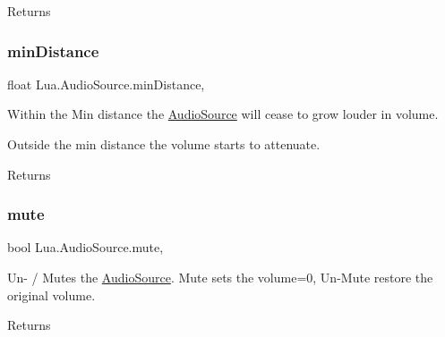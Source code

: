 \begin{DoxyReturn}{Returns}

\end{DoxyReturn}
\mbox{\label{class_lua_1_1_audio_source_a66155ad664c665455476ea70f4779669}} 
\subsubsection{\texorpdfstring{minDistance}{minDistance}}
{\footnotesize\ttfamily float Lua.\+Audio\+Source.\+min\+Distance\hspace{0.3cm}{\ttfamily [get]}, {\ttfamily [set]}}



Within the Min distance the \mbox{\hyperlink{class_lua_1_1_audio_source}{Audio\+Source}} will cease to grow louder in volume. 

Outside the min distance the volume starts to attenuate. \begin{DoxyReturn}{Returns}

\end{DoxyReturn}
\mbox{\label{class_lua_1_1_audio_source_ad82dcfe66567f1dac8a15edc327c89ff}} 
\subsubsection{\texorpdfstring{mute}{mute}}
{\footnotesize\ttfamily bool Lua.\+Audio\+Source.\+mute\hspace{0.3cm}{\ttfamily [get]}, {\ttfamily [set]}}



Un-\/ / Mutes the \mbox{\hyperlink{class_lua_1_1_audio_source}{Audio\+Source}}. Mute sets the volume=0, Un-\/\+Mute restore the original volume. 

\begin{DoxyReturn}{Returns}

\end{DoxyReturn}
\mbox{\label{class_lua_1_1_audio_source_a49d0053bb3cfa0b42c70f3b678e0d78f}} 
